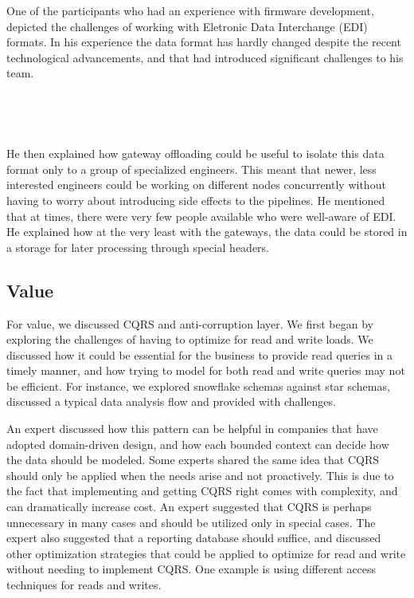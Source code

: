 \documentclass{bmcart}
\begin{document}
One of the participants who had an experience with firmware development, depicted the challenges of working with Eletronic Data Interchange (EDI) formats. In his experience the data format has hardly changed despite the recent technological advancements, and that had introduced significant challenges to his team. 

\,

\setlength{\fboxsep}{0.7em}
\noindent{}

\,

He then explained how gateway offloading could be useful to isolate this data format only to a group of specialized engineers. This meant that newer, less interested engineers could be working on different nodes concurrently without having to worry about introducing side effects to the pipelines. He mentioned that at times, there were very few people available who were well-aware of EDI. He explained how at the very least with the gateways, the data could be stored in a storage for later processing through special headers. 



\subsection{Value}

For value, we discussed CQRS and anti-corruption layer. We first began by exploring the challenges of having to optimize for read and write loads. We discussed how it could be essential for the business to provide read queries in a timely manner, and how trying to model for both read and write queries may not be efficient. For instance, we explored snowflake schemas against star schemas, discussed a typical data analysis flow and provided with challenges.

An expert discussed how this pattern can be helpful in companies that have adopted domain-driven design, and how each bounded context can decide how the data should be modeled. Some experts shared the same idea that CQRS should only be applied when the needs arise and not proactively. This is due to the fact that implementing and getting CQRS right comes with complexity, and can dramatically increase cost. An expert suggested that CQRS is perhaps unnecessary in many cases and should be utilized only in special cases. The expert also suggested that a reporting database should suffice, and discussed other optimization strategies that could be applied to optimize for read and write without needing to implement CQRS. One example is using different access techniques for reads and writes. 
\end{document}
